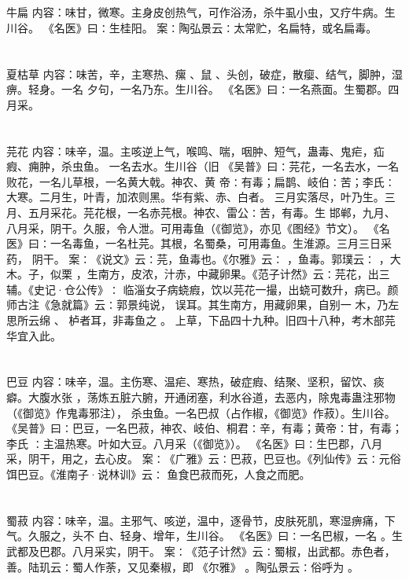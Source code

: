 \documentclass[12pt,UTF8]{ctexbook}
\begin{document}
\chapter{}牛扁
内容：味甘，微寒。主身皮创热气，可作浴汤，杀牛虱小虫，又疗牛病。生川谷。 
《名医》曰∶生桂阳。 
案∶陶弘景云∶太常贮，名扁特，或名扁毒。 


\chapter{}夏枯草
内容：味苦，辛，主寒热、瘰 、鼠 、头创，破症，散瘿、结气，脚肿，湿痹。轻身。一名 
夕句，一名乃东。生川谷。 
《名医》曰∶一名燕面。生蜀郡。四月采。 


\chapter{}芫花
内容：味辛，温。主咳逆上气，喉鸣、喘，咽肿、短气，蛊毒、鬼疟，疝瘕、痈肿，杀虫鱼。 
一名去水。生川谷（旧 
《吴普》曰∶芫花，一名去水，一名败花，一名儿草根，一名黄大戟。神农、黄 
帝∶有毒；扁鹊、岐伯∶苦；李氏∶大寒。二月生，叶青，加浓则黑。华有紫、赤、白者。 
三月实落尽，叶乃生。三月、五月采花。芫花根，一名赤芫根。神农、雷公∶苦，有毒。生 
邯郸，九月、八月采，阴干。久服，令人泄。可用毒鱼（《御览》，亦见《图经》节文）。 
《名医》曰∶一名毒鱼，一名杜芫。其根，名蜀桑，可用毒鱼。生淮源。三月三日采药， 
阴干。 
案∶《说文》云∶芫，鱼毒也。《尔雅》云∶ ，鱼毒。郭璞云∶ ，大木。子，似栗 
，生南方，皮浓，汁赤，中藏卵果。《范子计然》云∶芫花，出三辅。《史记·仓公传》∶ 
临淄女子病蛲瘕，饮以芫花一撮，出蛲可数升，病已。颜师古注《急就篇》云∶郭景纯说， 
误耳。其生南方，用藏卵果，自别一 木，乃左思所云绵 、 栌者耳，非毒鱼之 。 
上草，下品四十九种。旧四十八种，考木部芫华宜入此。 


\chapter{}巴豆
内容：味辛，温。主伤寒、温疟、寒热，破症瘕、结聚、坚积，留饮、痰癖。大腹水张 
，荡炼五脏六腑，开通闭塞，利水谷道，去恶内，除鬼毒蛊注邪物（《御览》作鬼毒邪注）， 
杀虫鱼。一名巴叔（占作椒，《御览》作菽）。生川谷。 
《吴普》曰∶巴豆，一名巴菽，神农、岐伯、桐君∶辛，有毒；黄帝∶甘，有毒；李氏 
∶主温热寒。叶如大豆。八月采（《御览》）。 
《名医》曰∶生巴郡，八月采，阴干，用之，去心皮。 
案∶《广雅》云∶巴菽，巴豆也。《列仙传》云∶元俗饵巴豆。《淮南子·说林训》云∶ 
鱼食巴菽而死，人食之而肥。 


\chapter{}蜀菽
内容：味辛，温。主邪气、咳逆，温中，逐骨节，皮肤死肌，寒湿痹痛，下气。久服之，头不 
白、轻身、增年，生川谷。 
《名医》曰∶一名巴椒，一名 。生武都及巴郡。八月采实，阴干。 
案∶《范子计然》云∶蜀椒，出武都。赤色者，善。陆玑云∶蜀人作荼，又见秦椒，即 
《尔雅》 。陶弘景云∶俗呼为 。 
\end{document}
